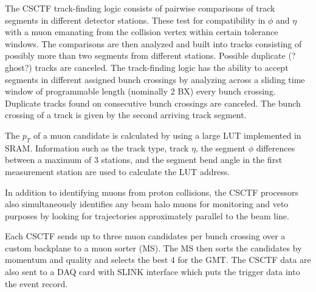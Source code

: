 The CSCTF track-finding logic consists of pairwise comparisons of track segments in different detector stations. These test for compatibility in $\phi$ and $\eta$ with a muon emanating from the collision vertex within certain tolerance windows. The comparisons are then analyzed and built into tracks consisting of possibly more than two segments from different stations. Possible duplicate (?ghost?) tracks are canceled. The track-finding logic has the ability to accept segments in different assigned bunch crossings by analyzing across a sliding time window of programmable length (nominally 2 BX) every bunch crossing. Duplicate tracks found on consecutive bunch crossings are canceled. The bunch crossing of a track is given by the second arriving track segment.

The $p_T$ of a muon candidate is calculated by using a large LUT implemented in SRAM. Information such as the track type, track $\eta$, the segment $\phi$ differences between a maximum of 3 stations, and the segment bend angle in the first measurement station are used to calculate the LUT address.

In addition to identifying muons from proton collisions, the CSCTF processors also simultaneously identifies any beam halo muons for monitoring and veto purposes by looking for trajectories approximately parallel to the beam line.

Each CSCTF sends up to three muon candidates per bunch crossing over a custom backplane to a muon sorter (MS). The MS then sorts the candidates by momentum and quality and selects the best 4 for the GMT. The CSCTF data are also sent to a DAQ card with SLINK interface which puts the trigger data into the event record.
